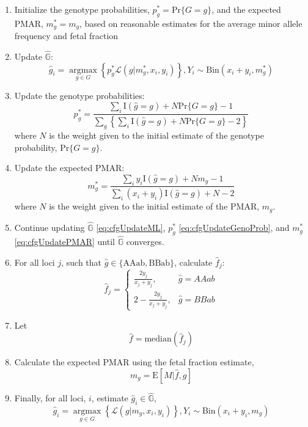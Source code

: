 \documentclass[11pt,letterpaper,oneside]{book}
\begin{document}
\begin{enumerate}
\def\labelenumi{\arabic{enumi}.}
\item
  Initialize the genotype probabilities, \(p_g^* = \text{Pr}\{G = g\}\), and the expected PMAR, \(m_g^* = m_g\), based on reasonable estimates for the average minor allele frequency and fetal fraction
\item
  Update \(\hat{\mathbb{G}}\):
  \[
   \hat{g}_i = \mathop{\text{argmax}}\limits_{g \in G}\left\{p_g^*\mathcal{L}(g \rvert m_g^*,x_i,y_i)\right\}, Y_{i} \sim \text{Bin}(x_i + y_i, m_g^*) \label{eq:cfgUpdateML}
    \]
\item
  Update the genotype probabilities:
  \[
   p_g^* = \frac{\sum_i \text{I}(\hat{g} = g) + N\text{Pr}\{G = g\} - 1}{\sum_g\left\{\sum_i \text{I}(\hat{g} = g) + N\text{Pr}\{G = g\} - 2\right\}} \label{eq:cfgUpdateGenoProb}
    \]
  where \(N\) is the weight given to the initial estimate of the genotype probability, \(\text{Pr}\{G = g\}\).
\item
  Update the expected PMAR:
  \[
   m_g^* = \frac{\sum_i y_i\text{I}(\hat{g} = g) + Nm_g - 1}{\sum_i(x_i + y_i)\text{I}(\hat{g} = g) + N - 2} \label{eq:cfgUpdatePMAR}
    \]
  where \(N\) is the weight given to the initial estimate of the PMAR, \(m_g\).
\item
  Continue updating \(\hat{\mathbb{G}}\) \eqref{eq:cfgUpdateML}, \(p_g^*\) \eqref{eq:cfgUpdateGenoProb}, and \(m_g^*\) \eqref{eq:cfgUpdatePMAR} until \(\hat{\mathbb{G}}\) converges.
\item
  For all loci \(j\), such that \(\hat{g} \in \{\text{AAab}, \text{BBab}\}\), calculate \(\hat{f}_j\):
  \[
  \hat{f}_j =
    \begin{cases}
      \displaystyle\frac{2y_j}{x_j + y_j}, & \hat{g} = AAab \\[15pt]
      2 - \displaystyle\frac{2y_j}{x_j + y_j}, & \hat{g} = BBab
    \end{cases} \label{eq:cfgEstFF}
    \]
\item
  Let
  \[
  \hat{f} = \text{median}\left(\hat{f}_j\right) \label{eq:cfgFFMed}
    \]
\item
  Calculate the expected PMAR using the fetal fraction estimate,
  \[
   m_g = \text{E}[M|\hat{f},g] \label{eq:cfgExpPMAR}
    \]
\item
  Finally, for all loci, \(i\), estimate \(\hat{g}_i \in \hat{\mathbb{G}}\),
  \[
    \hat{g}_i = \mathop{\text{argmax}}\limits_{g \in G}\left\{\mathcal{L}(g \rvert m_g,x_i,y_i)\right\}, Y_{i} \sim \text{Bin}(x_i + y_i, m_g) \label{eq:cfgML}
    \]
\end{enumerate}
\end{document}

